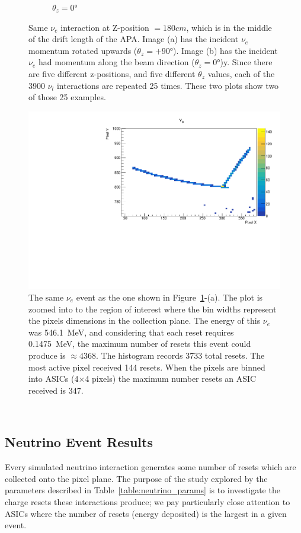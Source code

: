 \begin{figure}
\begin{subfigure}{.5\textwidth}
  \caption{$\theta_{z} = 0$\unit{\degree}}
\end{subfigure}
\caption{Same $\nu_{e}$ interaction at Z-position $= 180 cm$, which is in the middle of the drift length of the APA.
Image (a) has the incident $\nu_{e}$ momentum rotated upwards ($\theta_{z} = +90$\unit{\degree}).
Image (b) has the incident $\nu_{e}$ had momentum along the beam direction ($\theta_{z} = 0$\unit{\degree})y.
Since there are five different z-positions, and five different $\theta_{z}$ values, each of the 3900 $\nu_{l}$ interactions are repeated 25 times.
These two plots show two of those 25 examples.
}
\label{fig:compare_integral}
\end{figure}

\begin{figure}[]
\centering
\includegraphics[width=\textwidth]{images/electron_fhc_23708_event.pdf}
\caption{The same $\nu_{e}$ event as the one shown in Figure~\ref{fig:compare_integral}-(a).
The plot is zoomed into to the region of interest where the bin widths represent the pixels dimensions in the collection plane.
The energy of this $\nu_{e}$ was 546.1~\unit{MeV}, and considering that each reset requires 0.1475~\unit{MeV}, the maximum number of resets this event could produce is $\approx 4368$.
The histogram records 3733 total resets.
The most active pixel received 144 resets.
When the pixels are binned into ASICs (4$\times$4 pixels) the maximum number resets an ASIC received is 347.
}
\end{figure}~\label{fig:asic_th2i_electron_fhc_event}

\subsection{Neutrino Event Results}
Every simulated neutrino interaction generates some number of resets which are collected onto the pixel plane.
The purpose of the study explored by the parameters described in Table~\ref{table:neutrino_params} is to investigate the charge resets these interactions produce; we pay particularly close attention to ASICs where the number of resets (energy deposited) is the largest in a given event.

